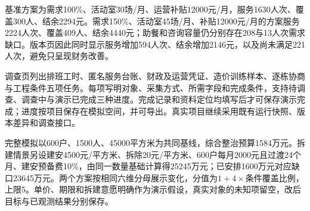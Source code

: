 基准方案为需求100\%、活动室30场/月、运营补贴12000元/月，服务1630人次、覆盖300人、结余2294元。需求150\%、活动室45场/月、补贴12000元/月的方案服务2224人次、覆盖409人、结余4440元；助餐和咨询容量仍分别存在208与13人次需求缺口。版本页因此同时显示服务增加594人次、结余增加2146元，以及尚未满足221人次，避免只呈现财务改善。

调查页列出排班工时、匿名服务台账、财政及运营凭证、造价训练样本、逐栋协商与工程条件五项任务。每项写明对象、采集方式、所需字段和完成条件，支持待调查、调查中与演示已完成三种进度。完成记录和资料定位均填写后才可保存演示完成；进度按项目保存在模拟空间，并可导出。真实项目继续采用既有运行快照、版本差异和调查接口。

完整模拟以600户、1500人、45000平方米为共同基线，综合整治预算1584万元。拆建情景另设建安4500元/平方米、拆除20元/平方米、600户每月2000元且过渡24个月、建安预备费10\%，由同一数量基础计算得25245万元；已安排1600万元对应缺口23645万元。两个方案按相同六维分母展示变化，分值为$1+4\times$条件覆盖比例，上限5。单价、期限和拆建意愿明确作为演示假设，真实对象的未知项留空，改后目标与已观测结果分别保存。
